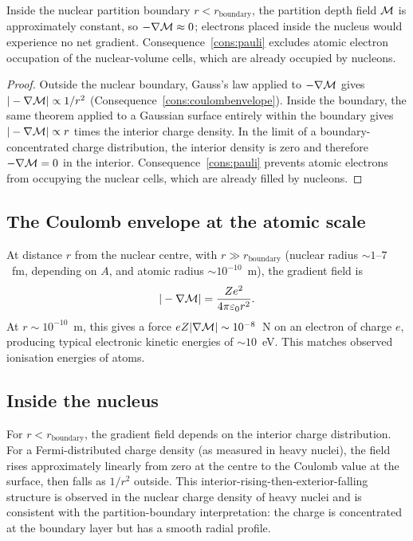 \begin{proposition}
\label{prop:interiordepth-nuclear}
Inside the nuclear partition boundary $r<r_{\mathrm{boundary}}$, the partition
depth field $\mathcal{M}$ is approximately constant, so $-\nabla\mathcal{M}\approx 0$;
electrons placed inside the nucleus would experience no net gradient.
Consequence~\ref{cons:pauli} excludes atomic electron occupation of the
nuclear-volume cells, which are already occupied by nucleons.
\end{proposition}

\begin{proof}
Outside the nuclear boundary, Gauss's law applied to $-\nabla\mathcal{M}$ gives
$|-\nabla\mathcal{M}|\propto 1/r^{2}$ (Consequence~\ref{cons:coulombenvelope}).
Inside the boundary, the same theorem applied to a Gaussian surface entirely
within the boundary gives $|-\nabla\mathcal{M}|\propto r$ times the interior charge
density.  In the limit of a boundary-concentrated charge distribution, the
interior density is zero and therefore $-\nabla\mathcal{M}=0$ in the interior.
Consequence~\ref{cons:pauli} prevents atomic electrons from occupying the
nuclear cells, which are already filled by nucleons.
\end{proof}

\subsection{The Coulomb envelope at the atomic scale}
\label{subsec:coulombatomic}

At distance $r$ from the nuclear centre, with $r\gg r_{\mathrm{boundary}}$
(nuclear radius $\sim 1$--$7$~fm, depending on $A$, and atomic radius
$\sim 10^{-10}$~m), the gradient field is
\[
  |-\nabla\mathcal{M}| = \frac{Ze^{2}}{4\pi\varepsilon_{0}r^{2}}.
\]
At $r\sim 10^{-10}$~m, this gives a force $eZ|\nabla\mathcal{M}|\sim 10^{-8}$~N
on an electron of charge $e$, producing typical electronic kinetic energies
of $\sim 10$~eV.  This matches observed ionisation energies of atoms.

\subsection{Inside the nucleus}
\label{subsec:insidenucleus}

For $r<r_{\mathrm{boundary}}$, the gradient field depends on the interior
charge distribution.  For a Fermi-distributed charge density (as measured in
heavy nuclei), the field rises approximately linearly from zero at the centre
to the Coulomb value at the surface, then falls as $1/r^{2}$ outside.  This
interior-rising-then-exterior-falling structure is observed in the nuclear
charge density of heavy nuclei \citep{hofstadter1956} and is consistent with
the partition-boundary interpretation: the charge is concentrated at the
boundary layer but has a smooth radial profile.

